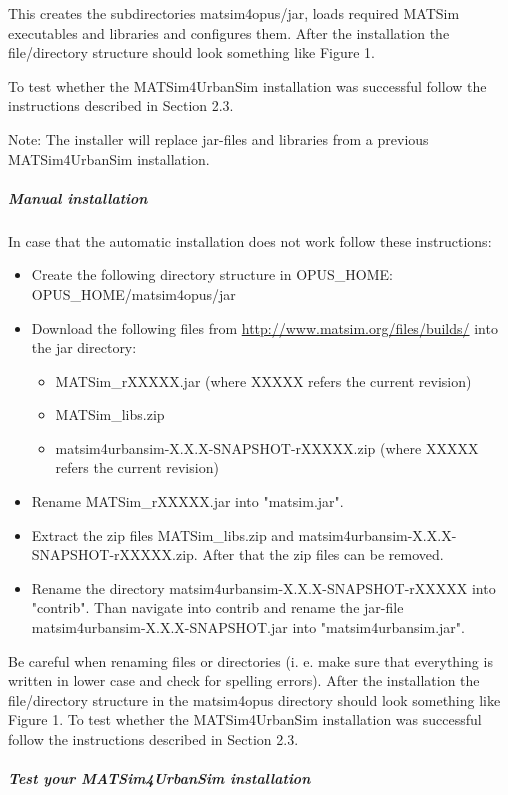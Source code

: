 \documentclass[a4paper,11pt]{report}
\begin{document}
This creates the subdirectories matsim4opus/jar, loads required  MATSim executables and libraries and configures them. After the  installation the file/directory structure should look something like  Figure 1.

To test whether the MATSim4UrbanSim installation was successful follow the instructions described in Section 2.3.

Note: The installer will replace jar-files and libraries from a previous MATSim4UrbanSim installation.

\subparagraph{Manual installation}

In case that the automatic installation does not work follow these instructions:
\begin{itemize}
	\item Create the following directory structure in OPUS\_HOME: OPUS\_HOME/matsim4opus/jar
	\item Download the following files from \href{http://www.matsim.org/files/builds/}{http://www.matsim.org/files/builds/} into the jar directory:   
\begin{itemize}
	\item MATSim\_rXXXXX.jar (where XXXXX refers the current revision)
	\item MATSim\_libs.zip
	\item matsim4urbansim-X.X.X-SNAPSHOT-rXXXXX.zip (where XXXXX refers the current revision)
\end{itemize}
	\item Rename MATSim\_rXXXXX.jar into "matsim.jar".
	\item Extract the zip files MATSim\_libs.zip and matsim4urbansim-X.X.X-SNAPSHOT-rXXXXX.zip. After that the zip files can be removed.
	\item Rename the directory matsim4urbansim-X.X.X-SNAPSHOT-rXXXXX into  "contrib". Than navigate into contrib and rename the jar-file  matsim4urbansim-X.X.X-SNAPSHOT.jar into "matsim4urbansim.jar".
\end{itemize}

Be careful when renaming files or directories (i. e. make sure  that everything is written in lower case and check for spelling errors).  After the installation the file/directory structure in the matsim4opus  directory should look something like Figure 1. To test whether the  MATSim4UrbanSim installation was successful follow the instructions  described in Section 2.3.

\subparagraph{Test your MATSim4UrbanSim installation}
\end{document}
